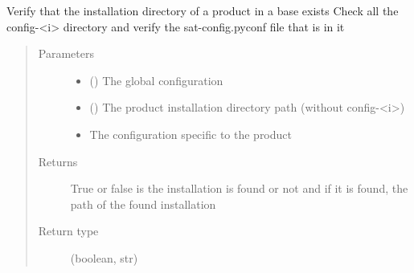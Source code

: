 \documentclass[a4paper,10pt,english]{sphinxmanual}
\begin{document}
\begin{fulllineitems}
\label{\detokenize{commands/apidoc/src:src.product.check_config_exists}}
Verify that the installation directory of a product in a base exists
Check all the config-\textless{}i\textgreater{} directory and verify the sat-config.pyconf file
that is in it
\begin{quote}\begin{description}
\item[{Parameters}] \leavevmode\begin{itemize}
\item {} 
 () \textendash{} The global configuration

\item {} 
 () \textendash{} The product installation directory path 
(without config-\textless{}i\textgreater{})

\item {} 
 \textendash{} The configuration specific to 
the product

\end{itemize}

\item[{Returns}] \leavevmode
True or false is the installation is found or not 
and if it is found, the path of the found installation

\item[{Return type}] \leavevmode
(boolean, str)

\end{description}\end{quote}

\end{fulllineitems}

\end{document}
